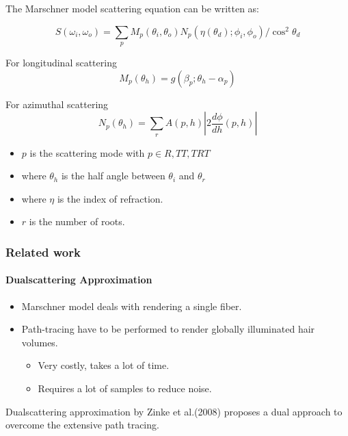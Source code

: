 \documentclass{beamer}
\begin{document}
  \begin{frame}
  The Marschner model scattering equation can be written as:
  
  \begin{equation}
  S(\omega_i, \omega_o) = \sum_p M_p(\theta_i, \theta_o) N_p(\eta(\theta_d); \phi_i, \phi_o) / \cos^2 \theta_d
  \end{equation}
  
  For longitudinal scattering
  \begin{equation}
  M_p(\theta_h) = g(\beta_p; \theta_h-\alpha_p)
  \end{equation}  
  
  For azimuthal scattering
  \begin{equation}
  N_p(\theta_h) = \sum_r A(p, h) | 2 \frac{d\phi}{dh}(p, h)|
  \end{equation}  
  
  \begin{itemize}
  \item $p$ is the scattering mode with $p \in {R, TT, TRT}$
  \item where $\theta_h$ is the half angle between $\theta_i$ and $\theta_r$
  \item where $\eta$ is the index of refraction.
  \item $r$ is the number of roots.
  \end{itemize}
  \end{frame}
  
  \begin{frame}
    \frametitle{Related work}
    \framesubtitle{Dualscattering Approximation}

\begin{itemize}
\item Marschner model deals with rendering a single fiber.
	
\item Path-tracing have to be performed to render globally illuminated hair volumes.

\begin{itemize}
\item Very costly, takes a lot of time.
\item Requires a lot of samples to reduce noise.
\end{itemize}
\end{itemize}

Dualscattering approximation by Zinke et al.(2008) proposes a dual approach to overcome the extensive path tracing.

  \end{frame}  
  
\end{document}
